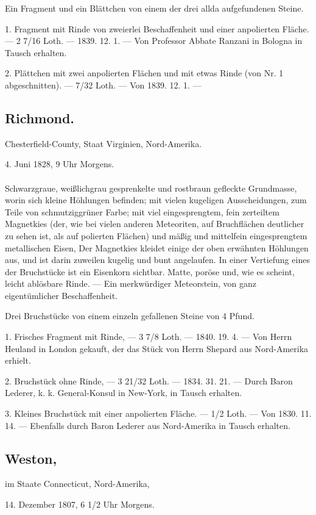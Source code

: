 \documentclass[a4paper, 11pt, oneside, polutonikogreek, german]{article}
\begin{document}
Ein Fragment und ein Blättchen von einem der drei allda aufgefundenen Steine.

1. Fragment mit Rinde von zweierlei Beschaffenheit und einer anpolierten Fläche. — 2 7/16 Loth. — 1839. 12. 1. — Von Professor Abbate Ranzani in Bologna in Tausch erhalten.

2. Plättchen mit zwei anpolierten Flächen und mit etwas Rinde (von Nr. 1 abgeschnitten). — 7/32 Loth. — Von 1839. 12. 1. —
\subsection{Richmond.}
\begin{center}
\small
Chesterfield-County, Staat Virginien, Nord-Amerika.

4. Juni 1828, 9 Uhr Morgens.
\end{center}
\paragraph{}
Schwarzgraue, weißlichgrau gesprenkelte und rostbraun gefleckte Grundmasse, worin sich kleine Höhlungen befinden; mit vielen kugeligen Ausscheidungen, zum Teile von schmutziggrüner Farbe; mit viel eingesprengtem, fein zerteiltem Magnetkies (der, wie bei vielen anderen Meteoriten, auf Bruchflächen deutlicher zu sehen ist, als auf polierten Flächen) und mäßig und mittelfein eingesprengtem metallischen Eisen, Der Magnetkies kleidet einige der oben erwähnten Höhlungen aus, und ist darin zuweilen kugelig und bunt angelaufen. In einer Vertiefung eines der Bruchstücke ist ein Eisenkorn sichtbar. Matte, poröse und, wie es scheint, leicht ablösbare Rinde. — Ein merkwürdiger Meteorstein, von ganz eigentümlicher Beschaffenheit.

Drei Bruchstücke von einem einzeln gefallenen Steine von 4 Pfund.

1. Frisches Fragment mit Rinde, — 3 7/8 Loth. — 1840. 19. 4. — Von Herrn Heuland in London gekauft, der das Stück von Herrn Shepard aus Nord-Amerika erhielt.

2. Bruchstück ohne Rinde, — 3 21/32 Loth. — 1834. 31. 21. — Durch Baron Lederer, k. k. General-Konsul in New-York, in Tausch erhalten.

3. Kleines Bruchstück mit einer anpolierten Fläche. — 1/2 Loth. — Von 1830. 11. 14. — Ebenfalls durch Baron Lederer aus Nord-Amerika in Tausch erhalten.
\subsection[Weston.]{Weston,}
\begin{center}
\small
im Staate Connecticut, Nord-Amerika,

14. Dezember 1807, 6 1/2 Uhr Morgens.
\end{center}
\end{document}
